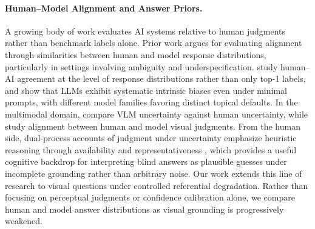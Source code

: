 \documentclass[letterpaper]{article}
\begin{document}
\paragraph{Human--Model Alignment and Answer Priors.}
A growing body of work evaluates AI systems relative to human judgments rather
than benchmark labels alone. Prior work argues for evaluating alignment
through similarities between human and model response distributions,
particularly in settings involving ambiguity and underspecification.
\citet{bao2026imagination} study human--AI agreement at the level of response
distributions rather than only top-1 labels, and \citet{kwon2025whatllms}
show that LLMs exhibit systematic intrinsic biases even under minimal
prompts, with different model families favoring distinct topical defaults.
In the multimodal domain, \citet{lan2025mind} compare VLM uncertainty
against human uncertainty, while \citet{lee2023visalign} study alignment
between human and model visual judgments. From the human side, dual-process accounts of judgment under
uncertainty emphasize heuristic reasoning through availability and
representativeness \citep{tversky1974judgment,kahneman2011thinking}, which
provides a useful cognitive backdrop for interpreting blind answers as
plausible guesses under incomplete grounding rather than arbitrary noise. Our
work extends this line of research to visual questions under controlled
referential degradation. Rather than focusing on perceptual judgments or
confidence calibration alone, we compare human and model answer
distributions as visual grounding is progressively weakened.


\end{document}
